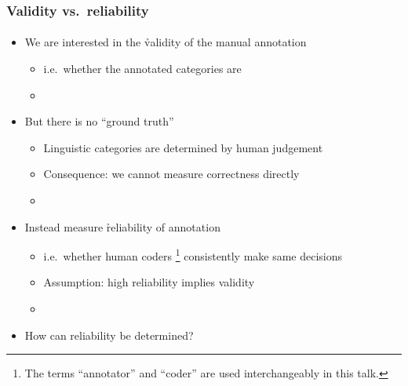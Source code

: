 \documentclass[t]{beamer} %
\begin{document}
\begin{frame}
  \frametitle{Validity vs.\ reliability}
  \framesubtitle{\citep[terminology from][]{Artstein:Poesio:08}}

  \begin{itemize}
  \item We are interested in the \h{validity} of the manual annotation
    \begin{itemize}
    \item i.e.\ whether the annotated categories are 
    \item[]\pause
    \end{itemize}
  \item But there is no ``ground truth''
    \begin{itemize}
    \item Linguistic categories are determined by human judgement
    \item Consequence: we cannot measure correctness directly
    \item[]\pause
    \end{itemize}
  \item Instead measure \h{reliability} of annotation
    \begin{itemize}
    \item i.e.\ whether human coders%
      \footnote{The terms ``annotator'' and ``coder'' are used interchangeably
        in this talk.} %
      consistently make same decisions
    \item Assumption: high reliability implies validity
    \item[]\pause
    \end{itemize}
  \item How can reliability be determined?
  \end{itemize}
\end{frame}
\end{document}

